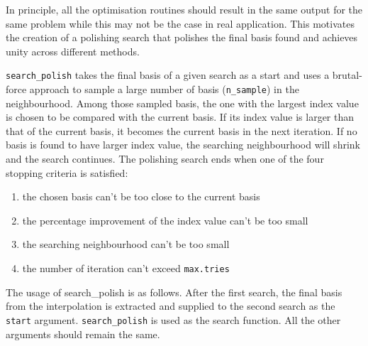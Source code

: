 \documentclass[12pt]{article}
\providecommand{\tightlist}{%
  \setlength{\itemsep}{0pt}\setlength{\parskip}{0pt}}
\begin{document}
In principle, all the optimisation routines should result in the same output for the same problem while this may not be the case in real application. This motivates the creation of a polishing search that polishes the final basis found and achieves unity across different methods.

\texttt{search\_polish} takes the final basis of a given search as a start and uses a brutal-force approach to sample a large number of basis (\texttt{n\_sample}) in the neighbourhood. Among those sampled basis, the one with the largest index value is chosen to be compared with the current basis. If its index value is larger than that of the current basis, it becomes the current basis in the next iteration. If no basis is found to have larger index value, the searching neighbourhood will shrink and the search continues. The polishing search ends when one of the four stopping criteria is satisfied:

\begin{enumerate}
\def\labelenumi{\arabic{enumi})}
\tightlist
\item
  the chosen basis can't be too close to the current basis
\item
  the percentage improvement of the index value can't be too small
\item
  the searching neighbourhood can't be too small
\item
  the number of iteration can't exceed \texttt{max.tries}
\end{enumerate}

The usage of search\_polish is as follows. After the first search, the final basis from the interpolation is extracted and supplied to the second search as the \texttt{start} argument. \texttt{search\_polish} is used as the search function. All the other arguments should remain the same.
\end{document}
